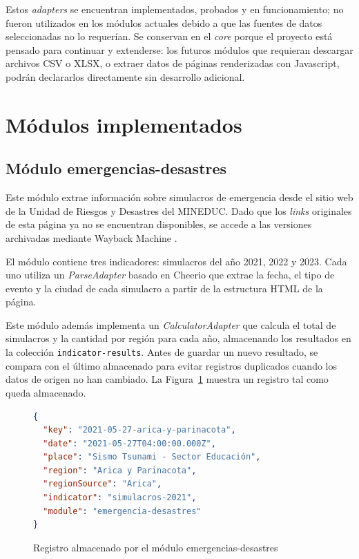 \documentclass[12pt,letterpaper,oneside]{report}
\begin{document}
Estos \textit{adapters} se encuentran implementados, probados y en funcionamiento; no fueron utilizados en los m\'odulos actuales debido a que las fuentes de datos seleccionadas no lo requer\'ian. Se conservan en el \textit{core} porque el proyecto est\'a pensado para continuar y extenderse: los futuros m\'odulos que requieran descargar archivos CSV o XLSX, o extraer datos de p\'aginas renderizadas con Javascript, podr\'an declararlos directamente sin desarrollo adicional.

\section{M\'odulos implementados}
\label{sec:modulos}

\subsection{M\'odulo emergencias-desastres}
\label{sec:modulo-ed}

Este m\'odulo extrae informaci\'on sobre simulacros de emergencia desde el sitio web de la Unidad de Riesgos y Desastres del MINEDUC. Dado que los \textit{links} originales de esta p\'agina ya no se encuentran disponibles, se accede a las versiones archivadas mediante Wayback Machine \parencite{waybackmachine}.

El m\'odulo contiene tres indicadores: simulacros del a\~no 2021, 2022 y 2023. Cada uno utiliza un \textit{ParseAdapter} basado en Cheerio que extrae la fecha, el tipo de evento y la ciudad de cada simulacro a partir de la estructura HTML de la p\'agina.

Este m\'odulo adem\'as implementa un \textit{CalculatorAdapter} que calcula el total de simulacros y la cantidad por regi\'on para cada a\~no, almacenando los resultados en la colecci\'on \texttt{indicator-results}. Antes de guardar un nuevo resultado, se compara con el \'ultimo almacenado para evitar registros duplicados cuando los datos de origen no han cambiado. La Figura~\ref{fig:datos-ed} muestra un registro tal como queda almacenado.

\begin{figure}[H]
\begin{lstlisting}[style=codigo, language=JSON]
{
  "key": "2021-05-27-arica-y-parinacota",
  "date": "2021-05-27T04:00:00.000Z",
  "place": "Sismo Tsunami - Sector Educación",
  "region": "Arica y Parinacota",
  "regionSource": "Arica",
  "indicator": "simulacros-2021",
  "module": "emergencia-desastres"
}
\end{lstlisting}
\caption{Registro almacenado por el m\'odulo emergencias-desastres}
\label{fig:datos-ed}
\end{figure}
\end{document}
